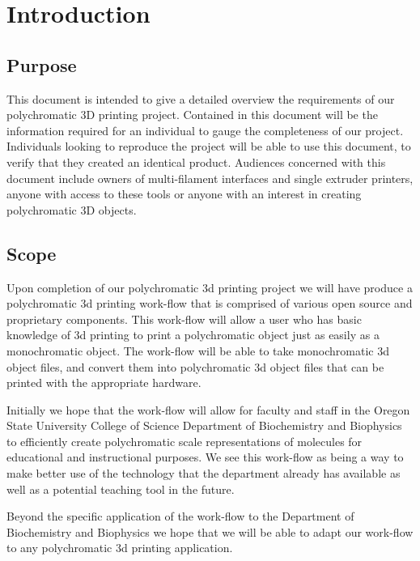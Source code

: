 \documentclass[letterpaper, onecolumn, draftclsnofoot, 10pt, compsoc]{IEEEtran}
\begin{document}
\section{Introduction}

\subsection{Purpose} %
This document is intended to give a detailed overview the requirements of our polychromatic 3D printing project.
Contained in this document will be the information required for an individual to gauge the completeness of our project.
Individuals looking to reproduce the project will be able to use this document, to verify that they created an identical product.
Audiences concerned with this document include owners of multi-filament interfaces and single extruder printers, anyone with access to these tools or anyone with an interest in creating polychromatic 3D objects.

\subsection{Scope} %
Upon completion of our polychromatic 3d printing project we will have produce a polychromatic 3d printing work-flow that is comprised of various open source and proprietary components. This work-flow will allow a user who has basic knowledge of 3d printing to print a polychromatic object just as easily as a monochromatic object. The work-flow will be able to take monochromatic 3d object files, and convert them into polychromatic 3d object files that can be printed with the appropriate hardware.\par
Initially we hope that the work-flow will allow for faculty and staff in the Oregon State University College of Science Department of Biochemistry and Biophysics to efficiently create polychromatic scale representations of molecules for educational and instructional purposes. We see this work-flow as being a way to make better use of the technology that the department already has available as well as a potential teaching tool in the future.\par
Beyond the specific application of the work-flow to the Department of Biochemistry and Biophysics we hope that we will be able to adapt our work-flow to any polychromatic 3d printing application.\par
\end{document}

